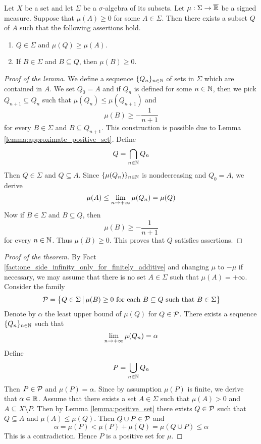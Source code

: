 \begin{lemma}\label{lemma:positive_set}
    Let $X$ be a set and let $\Sigma$ be a $\sigma$-algebra of its subsets. Let $\mu:\Sigma \rightarrow \overline{{\mathbb R}}$ be a signed measure. Suppose that $\mu(A) \geq 0$ for some $A \in \Sigma$. Then there exists a subset $Q$ of $A$ such that the following assertions hold.
    \begin{enumerate}[label=\emph{\textbf{(\arabic*)}}, leftmargin=3.0em]
        \item $Q \in \Sigma$ and $\mu(Q) \geq \mu(A)$.
        \item If $B \in \Sigma$ and $B \subseteq Q$, then $\mu(B) \geq 0$.
    \end{enumerate}
\end{lemma}
\begin{proof}[Proof of the lemma]
    We define a sequence $\{Q_n\}_{n\in {\mathbb N}}$ of sets in $\Sigma$ which are contained in $A$. We set $Q_0 = A$ and if $Q_n$ is defined for some $n \in {\mathbb N}$, then we pick $Q_{n+1} \subseteq Q_n$ such that $\mu(Q_n) \leq \mu(Q_{n+1})$ and
    $$\mu\left(B\right) \geq - \frac{1}{n+1}$$
    for every $B \in \Sigma$ and $B\subseteq Q_{n+1}$. This construction is possible due to Lemma \ref{lemma:approximate_positive_set}. Define
    $$Q = \bigcap_{n\in {\mathbb N}}Q_n$$
    Then $Q \in \Sigma$ and $Q\subseteq A$. Since $\{\mu(Q_n)\}_{n\in {\mathbb N}}$ is nondecreasing and $Q_0 = A$, we derive
    $$\mu(A) \leq \lim_{n\rightarrow +\infty}\mu(Q_n) = \mu(Q) $$
    Now if $B \in \Sigma$ and $B \subseteq Q$, then
    $$\mu(B) \geq -\frac{1}{n + 1}$$
    for every $n \in {\mathbb N}$. Thus $\mu(B) \geq 0$. This proves that $Q$ satisfies assertions.
\end{proof}

\begin{proof}[Proof of the theorem]
    By Fact \ref{fact:one_side_infinity_only_for_finitely_additive} and changing $\mu$ to $-\mu$ if necessary, we may assume that there is no set $A \in \Sigma$ such that $\mu(A) = +\infty$. Consider the family
    $${\mathcal P} = \big\{Q \in \Sigma\,\big|\,\mu(B)\geq 0\mbox{ for each }B\subseteq Q\mbox{ such that }B \in \Sigma\big\}$$
    Denote by $\alpha$ the least upper bound of $\mu(Q)$ for $Q \in {\mathcal P}$. There exists a sequence $\{Q_n\}_{n\in {\mathbb N}}$ such that
    $$\lim_{n\rightarrow +\infty}\mu(Q_n) = \alpha$$
    Define
    $$P = \bigcup_{n\in {\mathbb N}}Q_n$$
    Then $P \in {\mathcal P}$ and $\mu(P) = \alpha$. Since by assumption $\mu(P)$ is finite, we derive that $\alpha \in {\mathbb R}$. Assume that there exists a set $A \in \Sigma$ such that $\mu(A) > 0$ and $A \subseteq X\setminus P$. Then by Lemma \ref{lemma:positive_set} there exists $Q \in {\mathcal P}$ such that $Q \subseteq A$ and $\mu(A) \leq \mu(Q)$. Then $Q\cup P \in {\mathcal P}$ and
    $$\alpha = \mu(P) < \mu(P) + \mu(Q) = \mu(Q\cup P) \leq \alpha$$
    This is a contradiction. Hence $P$ is a positive set for $\mu$.
\end{proof}

